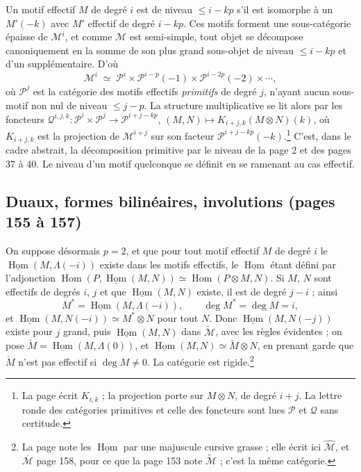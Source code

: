 \documentclass[11pt,a4paper]{article}
\begin{document}
Un motif effectif $M$ de degré $i$ est de niveau $\leqslant i - kp$ s'il est
isomorphe à un $M'(-k)$ avec $M'$ effectif de degré $i - kp$. Ces motifs forment une
sous-catégorie épaisse de $\mathcal{M}^{i}$, et comme $\mathcal{M}$ est semi-simple,
tout objet se décompose canoniquement en la somme de son plus grand sous-objet de
niveau $\leqslant i - kp$ et d'un supplémentaire. D'où
\[
\mathcal{M}^{i} \;\simeq\; \mathcal{P}^{i} \times \mathcal{P}^{i-p}(-1) \times
\mathcal{P}^{i-2p}(-2) \times \cdots ,
\]
où $\mathcal{P}^{j}$ est la catégorie des motifs effectifs \emph{primitifs} de degré
$j$, n'ayant aucun sous-motif non nul de niveau $\leqslant j - p$. La structure
multiplicative se lit alors par les foncteurs $\mathcal{Q}^{i,j,k} \colon
\mathcal{P}^{i} \times \mathcal{P}^{j} \to \mathcal{P}^{i+j-kp}$, $(M, N) \mapsto
K_{i+j,k}(M \otimes N)(k)$, où $K_{i+j,k}$ est la projection de $\mathcal{M}^{i+j}$ sur
son facteur $\mathcal{P}^{i+j-kp}(-k)$.\footnote{La page écrit $K_{i,k}$ ; la
projection porte sur $M \otimes N$, de degré $i+j$. La lettre ronde des catégories
primitives et celle des foncteurs sont lues $\mathcal{P}$ et $\mathcal{Q}$ sans
certitude.} C'est, dans le cadre abstrait, la décomposition primitive par le niveau
de la page 2 et des pages 37 à 40. Le niveau d'un motif quelconque se définit en se
ramenant au cas effectif.

\subsection*{Duaux, formes bilinéaires, involutions (pages 155 à 157)}

On suppose désormais $p = 2$, et que pour tout motif effectif $M$ de degré $i$ le
$\underline{\operatorname{Hom}}(M, \Lambda(-i))$ existe dans les motifs effectifs, le
$\underline{\operatorname{Hom}}$ étant défini par l'adjonction
$\operatorname{Hom}(P, \underline{\operatorname{Hom}}(M, N)) \simeq \operatorname{Hom}(P
\otimes M, N)$. Si $M$, $N$ sont effectifs de degrés $i$, $j$ et que
$\underline{\operatorname{Hom}}(M, N)$ existe, il est de degré $j - i$ ; ainsi
\[
M^{*} = \underline{\operatorname{Hom}}(M, \Lambda(-i)) , \qquad \deg M^{*} = \deg M = i ,
\]
et $\underline{\operatorname{Hom}}(M, N(-i)) \simeq M^{*} \otimes N$ pour tout $N$.
Donc $\underline{\operatorname{Hom}}(M, N(-j))$ existe pour $j$ grand, puis
$\underline{\operatorname{Hom}}(M, N)$ dans $\widetilde{\mathcal{M}}$, avec les règles
évidentes ; on pose $\check{M} = \underline{\operatorname{Hom}}(M, \Lambda(0))$, et
$\underline{\operatorname{Hom}}(M, N) \simeq \check{M} \otimes N$, en prenant garde
que $\check{M}$ n'est pas effectif si $\deg M \neq 0$. La catégorie est
rigide.\footnote{La page note les $\underline{\operatorname{Hom}}$ par une majuscule
cursive grasse ; elle écrit ici $\widehat{\mathcal{M}}$, et $\overline{\mathcal{M}}$
page 158, pour ce que la page 153 note $\widetilde{\mathcal{M}}$ ; c'est la même
catégorie.}
\end{document}
